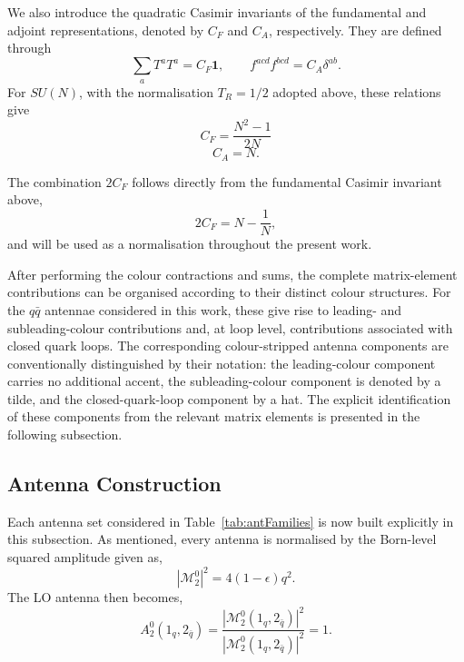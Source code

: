 We also introduce the quadratic Casimir invariants of the fundamental and
adjoint representations, denoted by $C_F$ and $C_A$, respectively. They are
defined through
\begin{equation}
    \sum_aT^aT^a=C_F\mathbf{1},\qquad f^{acd}f^{bcd}=C_A\delta^{ab}.
\end{equation}
For $SU(N)$, with the normalisation $T_R=1/2$ adopted above, these relations
give
\begin{equation*}
    C_F=\frac{N^2-1}{2N}
\end{equation*}
\begin{equation*}
    C_A=N.
\end{equation*}

The combination $2C_F$ follows directly from the fundamental Casimir
invariant above,
\begin{equation}\label{eq:colourNorm}
    2C_F=N-\frac1N,
\end{equation}
and will be used as a normalisation throughout the present work.

After performing the colour contractions and sums, the complete
matrix-element contributions can be organised according to their distinct
colour structures. For the $q\bar q$ antennae considered in this work, these
give rise to leading- and subleading-colour contributions and, at loop level,
contributions associated with closed quark loops. The corresponding
colour-stripped antenna components are conventionally distinguished by their
notation: the leading-colour component carries no additional accent, the
subleading-colour component is denoted by a tilde, and the closed-quark-loop
component by a hat. The explicit identification of these components from the
relevant matrix elements is presented in the following subsection.

\subsection{Antenna Construction}\label{subsec:antFamilies}

Each antenna set considered in Table~\ref{tab:antFamilies} is now built explicitly in this 
subsection.
As mentioned, every antenna is normalised by the Born-level squared amplitude given as,
\begin{equation}
    |\mathcal M_2^0|^2 = 4(1-\epsilon)q^2.
\end{equation}
The LO antenna then becomes,
\begin{equation}
    A_2^0(1_q,2_{\bar q}) = \frac{|\mathcal M_2^0(1_q,2_{\bar q})|^2}{|\mathcal M_2^0(1_q,2_{\bar q})|^2}=1.
\end{equation}

